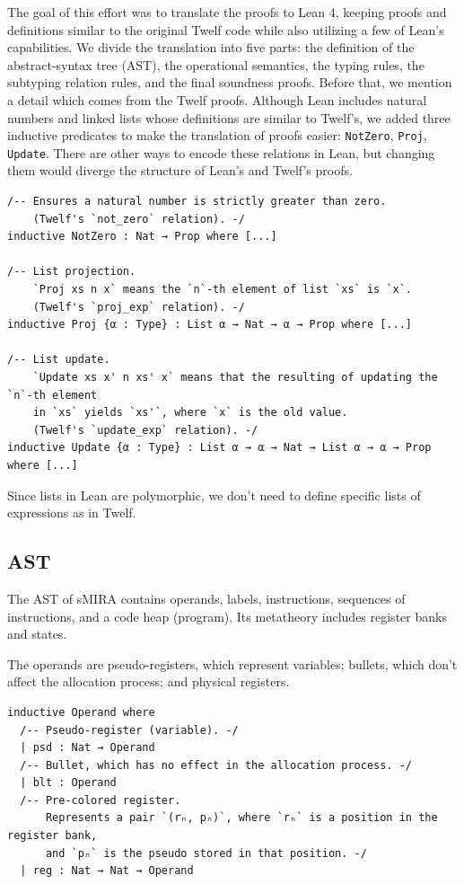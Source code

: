 \documentclass[]{NobArticle}
\begin{document}
The goal of this effort was to translate the proofs to Lean 4, keeping proofs and definitions similar to the original Twelf code while also utilizing a few of Lean's capabilities. We divide the translation into five parts: the definition of the abstract-syntax tree (AST), the operational semantics, the typing rules, the subtyping relation rules, and the final soundness proofs. Before that, we mention a detail which comes from the Twelf proofs. Although Lean includes natural numbers and linked lists whose definitions are similar to Twelf's, we added three inductive predicates to make the translation of proofs easier: \lstinline|NotZero|, \lstinline|Proj|, \lstinline|Update|. There are other ways to encode these relations in Lean, but changing them would diverge the structure of Lean's and Twelf's proofs.

\begin{minipage}{\linewidth}
\begin{lstlisting}
/-- Ensures a natural number is strictly greater than zero.
    (Twelf's `not_zero` relation). -/
inductive NotZero : Nat → Prop where [...]

/-- List projection.
    `Proj xs n x` means the `n`-th element of list `xs` is `x`.
    (Twelf's `proj_exp` relation). -/
inductive Proj {α : Type} : List α → Nat → α → Prop where [...]

/-- List update.
    `Update xs x' n xs' x` means that the resulting of updating the `n`-th element
    in `xs` yields `xs'`, where `x` is the old value.
    (Twelf's `update_exp` relation). -/
inductive Update {α : Type} : List α → α → Nat → List α → α → Prop where [...]
\end{lstlisting}
\end{minipage}

Since lists in Lean are polymorphic, we don't need to define specific lists of expressions as in Twelf.

\subsection{AST}

The AST of sMIRA contains operands, labels, instructions, sequences of instructions, and a code heap (program). Its metatheory includes register banks and states.

The operands are pseudo-registers, which represent variables; bullets, which don't affect the allocation process; and physical registers.

\begin{minipage}{\linewidth}
\begin{lstlisting}
inductive Operand where
  /-- Pseudo-register (variable). -/
  | psd : Nat → Operand
  /-- Bullet, which has no effect in the allocation process. -/
  | blt : Operand
  /-- Pre-colored register.
      Represents a pair `(rₙ, pₙ)`, where `rₙ` is a position in the register bank,
      and `pₙ` is the pseudo stored in that position. -/
  | reg : Nat → Nat → Operand
\end{lstlisting}
\end{minipage}
\end{document}

